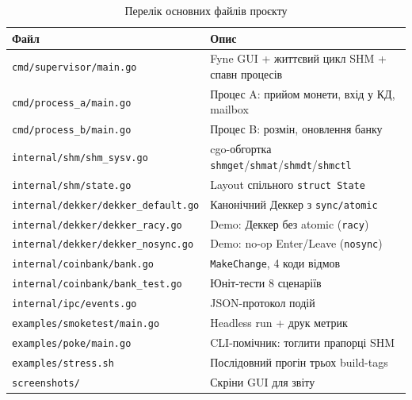 \documentclass[a4paper,12pt]{article}
\newcommand{\dstutablerules}{%
  \setlength{\tabcolsep}{5pt}%
  \renewcommand{\arraystretch}{1.2}%
}
\begin{document}
\begin{table}[H]
\caption{Перелік основних файлів проєкту}
\footnotesize
\dstutablerules
\begin{tabularx}{\linewidth}{@{}l L@{}}
\toprule
Файл & Опис \\
\midrule
\texttt{cmd/supervisor/main.go}             & Fyne GUI + життєвий цикл SHM + спавн процесів \\
\texttt{cmd/process\_a/main.go}             & Процес A: прийом монети, вхід у КД, mailbox \\
\texttt{cmd/process\_b/main.go}             & Процес B: розмін, оновлення банку \\
\texttt{internal/shm/shm\_sysv.go}          & cgo-обгортка \texttt{shmget}/\texttt{shmat}/\texttt{shmdt}/\texttt{shmctl} \\
\texttt{internal/shm/state.go}              & Layout спільного \texttt{struct State} \\
\texttt{internal/dekker/dekker\_default.go} & Канонічний Деккер з \texttt{sync/atomic} \\
\texttt{internal/dekker/dekker\_racy.go}    & Demo: Деккер без atomic (\texttt{racy}) \\
\texttt{internal/dekker/dekker\_nosync.go}  & Demo: no-op Enter/Leave (\texttt{nosync}) \\
\texttt{internal/coinbank/bank.go}          & \texttt{MakeChange}, 4 коди відмов \\
\texttt{internal/coinbank/bank\_test.go}    & Юніт-тести 8 сценаріїв \\
\texttt{internal/ipc/events.go}             & JSON-протокол подій \\
\texttt{examples/smoketest/main.go}         & Headless run + друк метрик \\
\texttt{examples/poke/main.go}              & CLI-помічник: тоглити прапорці SHM \\
\texttt{examples/stress.sh}                 & Послідовний прогін трьох build-tags \\
\texttt{screenshots/}                       & Скріни GUI для звіту \\
\bottomrule
\end{tabularx}
\end{table}
\end{document}
